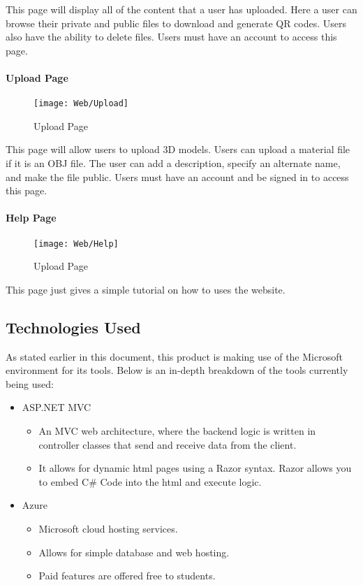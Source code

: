         This page will display all of the content that a user has uploaded. Here a user can browse their private and public files to download and generate QR codes. Users also have the ability to delete files. Users must have an account to access this page.

    \paragraph{Upload Page}
        \begin{figure}[H]
        \texttt{[image: Web/Upload]}
        \centering
        \caption{Upload Page}
        \label{fig:UploadPage}
        \end{figure}

        This page will allow users to upload 3D models. Users can upload a material file if it is an OBJ file. The user can add a description, specify an alternate name, and make the file public. Users must have an account and be signed in to access this page.

    \paragraph{Help Page}
        \begin{figure}[H]
        \texttt{[image: Web/Help]}
        \centering
        \caption{Upload Page}
        \label{fig:HelpPage}
        \end{figure}
    
        This page just gives a simple tutorial on how to uses the website.

\subsection{Technologies Used}

    As stated earlier in this document, this product is making use
    of the Microsoft environment for its tools. Below is an in-depth 
    breakdown of the tools currently being used:

    \begin{itemize}
    \item ASP.NET MVC
    \begin{itemize}
        \item An MVC web architecture, where the backend logic is written in controller classes
        that send and receive data from the client.
        \item It allows for dynamic html pages using a Razor syntax. Razor allows
        you to embed C\# Code into the html and execute logic.
    \end{itemize}
    
    \item Azure
        \begin{itemize}
            \item Microsoft cloud hosting services.
            \item Allows for simple database and web hosting.
            \item Paid features are offered free to students.
        \end{itemize}
    \end{itemize}


